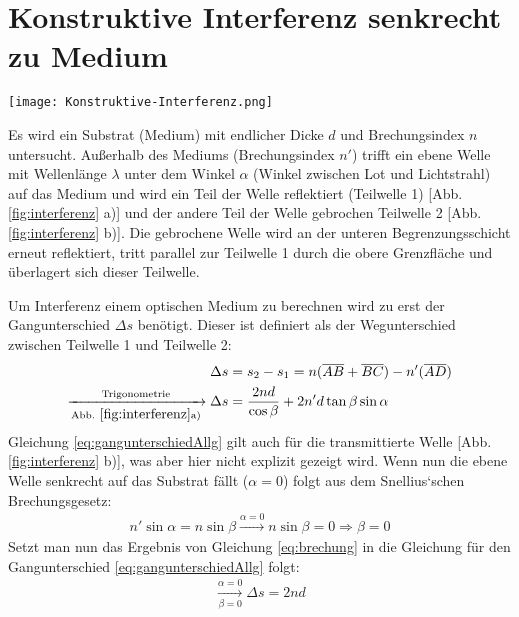 
\newpage
\section{Konstruktive Interferenz senkrecht zu Medium}
\label{sec:interferenz}
\begin{center}
	\captionsetup{type=figure}
	\texttt{[image: Konstruktive-Interferenz.png]}
	\label{fig:interferenz}
\end{center}
Es wird ein Substrat (Medium) mit endlicher Dicke $d$ und Brechungsindex $n$ untersucht. Außerhalb des Mediums (Brechungsindex $n'$) trifft ein ebene Welle mit Wellenlänge $\lambda$ unter dem Winkel $\alpha$ (Winkel zwischen Lot und Lichtstrahl) auf das Medium und wird ein Teil der Welle reflektiert (Teilwelle 1) [Abb. \ref{fig:interferenz} a)] und der andere Teil der Welle gebrochen Teilwelle 2 [Abb. \ref{fig:interferenz} b)]. Die gebrochene Welle wird an der unteren Begrenzungsschicht erneut reflektiert, tritt parallel zur Teilwelle 1 durch die obere Grenzfläche und überlagert sich dieser Teilwelle.\bigskip

Um Interferenz einem optischen Medium zu berechnen wird zu erst der Gangunterschied $\Delta s$ benötigt.
Dieser ist definiert als der Wegunterschied zwischen Teilwelle 1 und Teilwelle 2: 
\begin{gather}
	\begin{aligned}
		\Delta s &= s_2 - s_1 = n(\overline{AB} + \overline{BC}) - n'(\overline{AD}) \\ 
		\xrightarrow[\mathrm{Abb.}~ \ref{fig:interferenz} \mathrm{a)}]{\mathrm{Trigonometrie}} \Delta s &= \frac{2nd}{\cos\beta} + 2n'd\tan\beta\sin\alpha
	\end{aligned}
	\label{eq:gangunterschiedAllg} 
\end{gather}
Gleichung \ref{eq:gangunterschiedAllg} gilt auch für die transmittierte Welle [Abb. \ref{fig:interferenz} b)], was aber hier nicht explizit gezeigt wird. Wenn nun die ebene Welle senkrecht auf das Substrat fällt ($\alpha = 0$) folgt aus dem Snellius`schen Brechungsgesetz:
\begin{gather}
	n'\sin\alpha=n\sin\beta \xrightarrow{\alpha=0} n\sin\beta = 0 \Rightarrow \boxed{\beta = 0}
	\label{eq:brechung}
\end{gather}
Setzt man nun das Ergebnis von Gleichung \ref{eq:brechung} in die Gleichung für den Gangunterschied \ref{eq:gangunterschiedAllg} folgt:
\begin{gather}
	\xrightarrow[\beta = 0]{\alpha = 0} \boxed{\Delta s = 2nd}
	\label{eq:gangunterschied}
\end{gather}\bigskip

